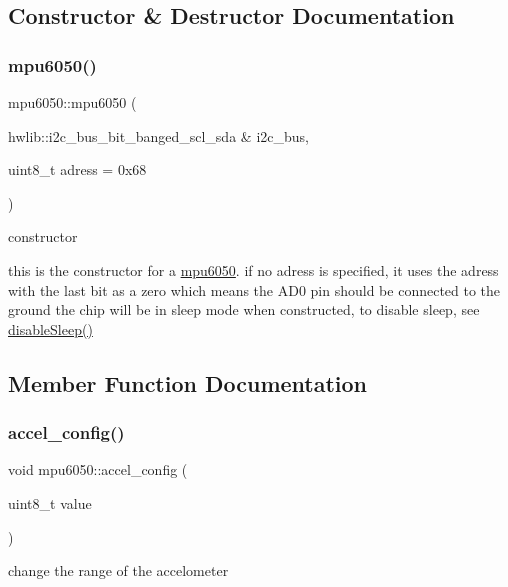 \subsection{Constructor \& Destructor Documentation}
\mbox{\label{classmpu6050_a1938b793c68db02885ef121b0718db54}} 
\subsubsection{\texorpdfstring{mpu6050()}{mpu6050()}}
{\footnotesize\ttfamily mpu6050\+::mpu6050 (\begin{DoxyParamCaption}\item[{hwlib\+::i2c\+\_\+bus\+\_\+bit\+\_\+banged\+\_\+scl\+\_\+sda \&}]{i2c\+\_\+bus,  }\item[{uint8\+\_\+t}]{adress = {\ttfamily 0x68} }\end{DoxyParamCaption})}



constructor 

this is the constructor for a \hyperlink{classmpu6050}{mpu6050}. if no adress is specified, it uses the adress with the last bit as a zero which means the A\+D0 pin should be connected to the ground the chip will be in sleep mode when constructed, to disable sleep, see \hyperlink{classmpu6050_af945ffe99c421c67cd4e4134a37f99d2}{disable\+Sleep()} 

\subsection{Member Function Documentation}
\mbox{\label{classmpu6050_a4beff110fd439cee20fe7bbf1d18b5cf}} 
\subsubsection{\texorpdfstring{accel\+\_\+config()}{accel\_config()}}
{\footnotesize\ttfamily void mpu6050\+::accel\+\_\+config (\begin{DoxyParamCaption}\item[{uint8\+\_\+t}]{value }\end{DoxyParamCaption})}



change the range of the accelometer 


